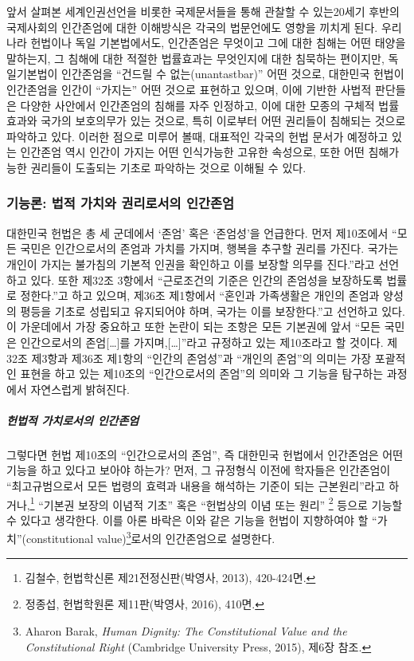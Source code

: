 앞서 살펴본 세계인권선언을 비롯한 국제문서들을 통해 관찰할 수 있는20세기 후반의 국제사회의 인간존엄에 대한 이해방식은 각국의 법문언에도 영향을 끼치게 된다. 우리나라 헌법이나 독일 기본법에서도, 인간존엄은 무엇이고 그에 대한 침해는 어떤 태양을 말하는지, 그 침해에 대한 적절한 법률효과는 무엇인지에 대한 침묵하는 편이지만, 독일기본법이 인간존엄을 ``건드릴 수 없는(unantastbar)'' 어떤 것으로, 대한민국 헌법이 인간존엄을 인간이 ``가지는'' 어떤 것으로 표현하고 있으며, 이에 기반한 사법적 판단들은 다양한 사안에서 인간존엄의 침해를 자주 인정하고, 이에 대한 모종의 구체적 법률효과와 국가의 보호의무가 있는 것으로, 특히 이로부터 어떤 권리들이 침해되는 것으로 파악하고 있다. 이러한 점으로 미루어 볼때, 대표적인 각국의 헌법 문서가 예정하고 있는 인간존엄 역시 인간이 가지는 어떤 인식가능한 고유한 속성으로, 또한 어떤 침해가능한 권리들이 도출되는 기초로 파악하는 것으로 이해될 수 있다.

\subsubsection{기능론: 법적 가치와 권리로서의 인간존엄}

대한민국 헌법은 총 세 군데에서 `존엄' 혹은 `존엄성'을 언급한다. 먼저 제10조에서 ``모든 국민은 인간으로서의 존엄과 가치를 가지며, 행복을 추구할 권리를 가진다. 국가는 개인이 가지는 불가침의 기본적 인권을 확인하고 이를 보장할 의무를 진다.''라고 선언하고 있다. 또한 제32조 3항에서 ``근로조건의 기준은 인간의 존엄성을 보장하도록 법률로 정한다.''고 하고 있으며, 제36조 제1항에서 ``혼인과 가족생활은 개인의 존엄과 양성의 평등을 기초로 성립되고 유지되어야 하며, 국가는 이를 보장한다.''고 선언하고 있다. 이 가운데에서 가장 중요하고 또한 논란이 되는 조항은 모든 기본권에 앞서 ``모든 국민은 인간으로서의 존엄{[}\ldots{]}를 가지며,{[}\ldots{]}''라고 규정하고 있는 제10조라고 할 것이다. 제32조 제3항과 제36조 제1항의 ``인간의 존엄성''과 ``개인의 존엄''의 의미는 가장 포괄적인 표현을 하고 있는 제10조의 ``인간으로서의 존엄''의 의미와 그 기능을 탐구하는 과정에서 자연스럽게 밝혀진다.

\subparagraph{헌법적 가치로서의 인간존엄}

그렇다면 헌법 제10조의 ``인간으로서의 존엄'', 즉 대한민국 헌법에서 인간존엄은 어떤 기능을 하고 있다고 보아야 하는가? 먼저, 그 규정형식 이전에 학자들은 인간존엄이 ``최고규범으로서 모든 법령의 효력과 내용을 해석하는 기준이 되는 근본원리''라고 하거나,\footnote{김철수, 헌법학신론 제21전정신판(박영사, 2013), 420-424면.} ``기본권 보장의 이념적 기초'' 혹은 ``헌법상의 이념 또는 원리'' \footnote{정종섭, 헌법학원론 제11판(박영사, 2016), 410면.} 등으로 기능할 수 있다고 생각한다. 이를 아론 바락은 이와 같은 기능을 헌법이 지향하여야 할 ``가치''(constitutional value)\footnote{Aharon Barak, \emph{Human Dignity: The Constitutional Value and the Constitutional Right} (Cambridge University Press, 2015), 제6장 참조.}로서의 인간존엄으로 설명한다.

